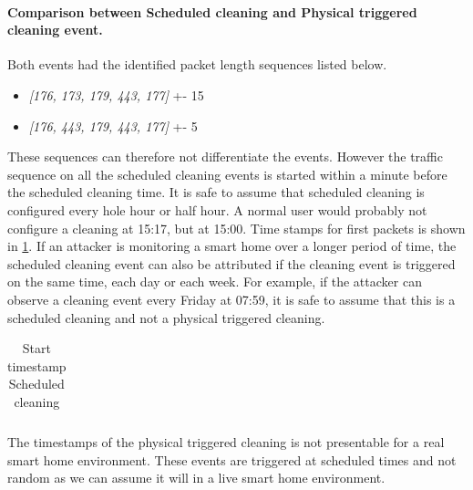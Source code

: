 \paragraph{Comparison between Scheduled cleaning and Physical triggered cleaning event.} Both events had the identified packet length sequences listed below. 
\begin{itemize}
    \item \textit{[176, 173, 179, 443, 177]} +- 15
    \item \textit{[176, 443, 179, 443, 177]} +- 5
\end{itemize}
These sequences can therefore not differentiate the events. However the traffic sequence on all the scheduled cleaning events is started within a minute before the scheduled cleaning time. It is safe to assume that scheduled cleaning is configured every hole hour or half hour. A normal user would probably not configure a cleaning at 15:17, but at 15:00. Time stamps for first packets is shown in \ref{tab:timestampSCPC}. If an attacker is monitoring a smart home over a longer period of time, the scheduled cleaning event can also be attributed if the cleaning event is triggered on the same time, each day or each week. For example, if the attacker can observe a cleaning event every Friday at 07:59, it is safe to assume that this is a scheduled cleaning and not a physical triggered cleaning.



\begin{table}[H]
\centering
\caption{Start timestamp Scheduled cleaning}
\label{tab:timestampSCPC}
\begin{tabular}{|l|l|l|l|l|l|l|l|l|}
\hline

\end{tabular}
\end{table}

The timestamps of the physical triggered cleaning is not presentable for a real smart home environment. These events are triggered at scheduled times and not random as we can assume it will in a live smart home environment. 

